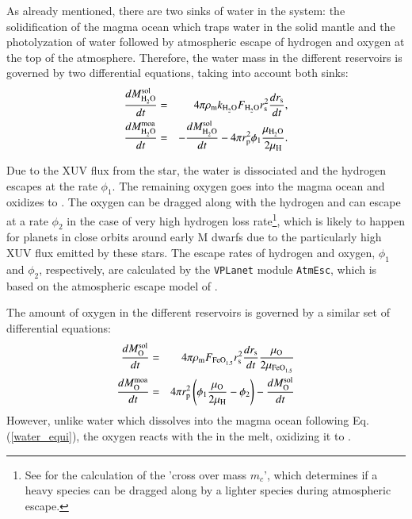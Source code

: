 \documentclass[paper=letterpaper,fontsize=12pt,oneside,twocolumn]{article}
\newcommand{\vplanet}{\texttt{\footnotesize{VPLanet}}}
\newcommand{\atmesc}{\texttt{\footnotesize{AtmEsc}}}
\begin{document}
As already mentioned, there are two sinks of water in the system: the solidification of the magma ocean which traps water in the solid mantle and the photolyzation of water followed by atmospheric escape of hydrogen and oxygen at the top of the atmosphere.
Therefore, the water mass in the different reservoirs is governed by two differential equations, taking into account both sinks:
\begin{eqnarray}
	\label{Deriv_Watersol}
	\frac{dM_{\ce{H2O}}^{\mathrm{sol}}}{dt} &=& 4 \pi \rho_\mathrm{m}  k_{\ce{H2O}} F_{\ce{H2O}} r_\mathrm{s}^2 \frac{d r_\mathrm{s}}{dt}, \\
	\frac{dM_{\ce{H2O}}^{\mathrm{moa}}}{dt} &=& - \frac{dM_{\ce{H2O}}^{\mathrm{sol}}}{dt} - 4 \pi r_\mathrm{p}^2 \phi_1 \frac{\mu_{\ce{H2O}}}{2 \mu_{\ce{H}}}.
	\label{Dervi_Watermo}
\end{eqnarray}

Due to the XUV flux from the star, the water is dissociated and the hydrogen escapes at the rate $\phi_1$.
The remaining oxygen goes into the magma ocean and oxidizes  to .
The oxygen can be dragged along with the hydrogen and can escape at a rate $\phi_2$ in the case of very high hydrogen loss rate\footnote{See \citet{Hunten1987} for the calculation of the 'cross over mass $m_c$', which determines if a heavy species can be dragged along by a lighter species during atmospheric escape.}, which is likely to happen for planets in close orbits around early M dwarfs due to the particularly high XUV flux emitted by these stars. The escape rates of hydrogen and oxygen, 
$\phi_1$ and $\phi_2$, respectively, are calculated by the \vplanet{} module \atmesc{}, which is based on the atmospheric escape model of \citet{Luger2015a}.

The amount of oxygen in the different reservoirs is governed by a similar set of differential equations:
\begin{eqnarray}
	\label{Deriv_Oxysol}
	\frac{dM_{\ce{O}}^{\mathrm{sol}}}{dt} &=& 4 \pi \rho_\mathrm{m}  F_{\ce{FeO_{1.5}}} r_\mathrm{s}^2 \frac{d r_\mathrm{s}}{dt} \frac{\mu_{\ce{O}}}{2 \mu_{\ce{FeO_{1.5}}}}\\
	\frac{dM_{\ce{O}}^{\mathrm{moa}}}{dt} &=& 4 \pi r_\mathrm{p}^2 \left(  \phi_1 \frac{\mu_{\ce{O}}}{2 \mu_{\ce{H}}} - \phi_2 \right) - \frac{dM_{\ce{O}}^{\mathrm{sol}}}{dt}
	\label{Deriv_Oxymo}
\end{eqnarray}
However, unlike water which dissolves into the magma ocean following Eq. (\ref{water_equi}), the oxygen reacts with the  in the melt, oxidizing it to .
\end{document}
